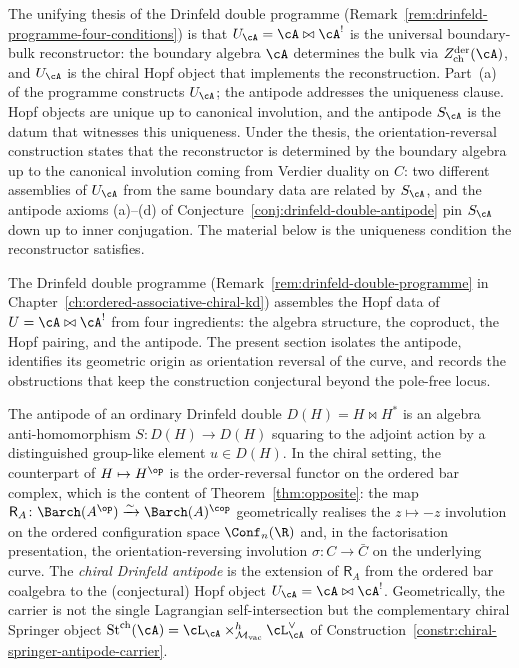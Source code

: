 The unifying thesis of the Drinfeld double programme
(Remark~\ref{rem:drinfeld-programme-four-conditions}) is that
$U_\cA = \cA\bowtie\cA^!$ is the universal boundary-bulk
reconstructor: the boundary algebra $\cA$ determines the bulk
via $Z^{\mathrm{der}}_{\mathrm{ch}}(\cA)$, and $U_\cA$ is the
chiral Hopf object that implements the reconstruction. Part~(a)
of the programme constructs $U_\cA$; the antipode addresses the
uniqueness clause. Hopf objects are unique up to canonical
involution, and the antipode $S_\cA$ is the datum that witnesses
this uniqueness. Under the thesis, the orientation-reversal
construction states that the reconstructor is determined by the
boundary algebra up to the canonical involution coming from
Verdier duality on $C$: two different assemblies of $U_\cA$ from
the same boundary data are related by $S_\cA$, and the antipode
axioms (a)--(d) of Conjecture~\ref{conj:drinfeld-double-antipode}
pin $S_\cA$ down up to inner conjugation. The material below is
the uniqueness condition the reconstructor satisfies.

The Drinfeld double programme (Remark~\ref{rem:drinfeld-double-programme}
 in Chapter~\ref{ch:ordered-associative-chiral-kd}) assembles the Hopf
data of $U = \cA \bowtie \cA^!$ from four ingredients: the algebra
structure, the coproduct, the Hopf pairing, and the antipode. The
present section isolates the antipode, identifies its geometric origin
as orientation reversal of the curve, and records the obstructions
that keep the construction conjectural beyond the pole-free locus.

The antipode of an ordinary Drinfeld double $D(H) = H \bowtie H^*$ is
an algebra anti-homomorphism $S \colon D(H) \to D(H)$ squaring to the
adjoint action by a distinguished group-like element $u \in D(H)$.
In the chiral
setting, the counterpart of $H \mapsto H^{\op}$ is the order-reversal
functor on the ordered bar complex, which is the content of
Theorem~\ref{thm:opposite}: the map
$\mathsf{R}_A \colon \Barch(A^{\op}) \xrightarrow{\sim} \Barch(A)^{\cop}$
geometrically realises the $z \mapsto -z$ involution on the ordered
configuration space $\Conf_n(\R)$ and, in the factorisation
presentation, the orientation-reversing involution
$\sigma \colon C \to \bar{C}$ on the underlying curve. The
\emph{chiral Drinfeld antipode} is the extension of $\mathsf{R}_A$
from the ordered bar coalgebra to the (conjectural) Hopf object
$U_\cA = \cA \bowtie \cA^!$.  Geometrically, the carrier is not the
single Lagrangian self-intersection but the complementary chiral
Springer object
\(\Stch(\cA)=\cL_{\cA}\times^h_{\Mvac}\cL_{\cA}^{\vee}\)
of Construction~\ref{constr:chiral-springer-antipode-carrier}.

